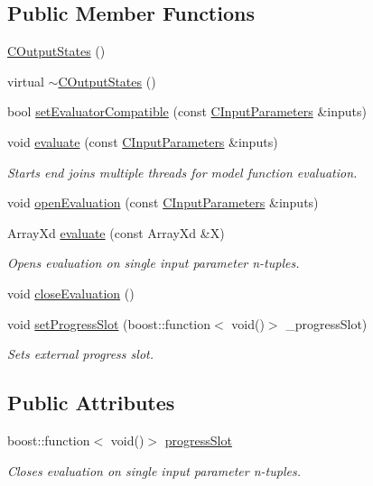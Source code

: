 \subsection*{Public Member Functions}
\begin{DoxyCompactItemize}
\item 
\hyperlink{class_go_s_u_m_1_1_c_output_states_a78ee554531ace49e677ac5f6aabb1793}{C\-Output\-States} ()
\item 
virtual \hyperlink{class_go_s_u_m_1_1_c_output_states_a7243b706e954618d47c90d69a28f5ecc}{$\sim$\-C\-Output\-States} ()
\item 
bool \hyperlink{class_go_s_u_m_1_1_c_output_states_ac90deb06c63df80bc34ee2c664562a43}{set\-Evaluator\-Compatible} (const \hyperlink{class_go_s_u_m_1_1_c_input_parameters}{C\-Input\-Parameters} \&inputs)
\item 
void \hyperlink{class_go_s_u_m_1_1_c_output_states_a8041e00b80f9027b5f949c6dd1dcee74}{evaluate} (const \hyperlink{class_go_s_u_m_1_1_c_input_parameters}{C\-Input\-Parameters} \&inputs)
\begin{DoxyCompactList}\small\item\em Starts end joins multiple threads for model function evaluation. \end{DoxyCompactList}\item 
void \hyperlink{class_go_s_u_m_1_1_c_output_states_ad286b10860c762d05821da1f81c8b4de}{open\-Evaluation} (const \hyperlink{class_go_s_u_m_1_1_c_input_parameters}{C\-Input\-Parameters} \&inputs)
\item 
Array\-Xd \hyperlink{class_go_s_u_m_1_1_c_output_states_a7ba935ed20daaee5deabf1d99dbecc6e}{evaluate} (const Array\-Xd \&X)
\begin{DoxyCompactList}\small\item\em Opens evaluation on single input parameter n-\/tuples. \end{DoxyCompactList}\item 
void \hyperlink{class_go_s_u_m_1_1_c_output_states_a281641905b4c5bcaa6b0beb1a5c880dc}{close\-Evaluation} ()
\item 
void \hyperlink{class_go_s_u_m_1_1_c_output_states_ac8f7c955c7e0b1257bb6323f9b23f565}{set\-Progress\-Slot} (boost\-::function$<$ void()$>$ \-\_\-progress\-Slot)
\begin{DoxyCompactList}\small\item\em Sets external progress slot. \end{DoxyCompactList}\end{DoxyCompactItemize}
\subsection*{Public Attributes}
\begin{DoxyCompactItemize}
\item 
boost\-::function$<$ void()$>$ \hyperlink{class_go_s_u_m_1_1_c_output_states_af87022e02d37a1ed2c804776f15b30b7}{progress\-Slot}
\begin{DoxyCompactList}\small\item\em Closes evaluation on single input parameter n-\/tuples. \end{DoxyCompactList}\end{DoxyCompactItemize}
